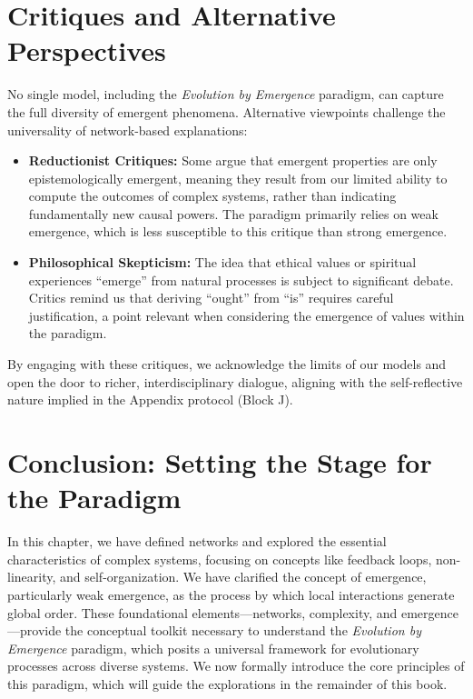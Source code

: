 \section*{Critiques and Alternative Perspectives}
No single model, including the \emph{Evolution by Emergence} paradigm, can capture the full diversity of emergent phenomena. Alternative viewpoints challenge the universality of network-based explanations:
\begin{itemize}
    \item \textbf{Reductionist Critiques:} Some argue that emergent properties are only epistemologically emergent, meaning they result from our limited ability to compute the outcomes of complex systems, rather than indicating fundamentally new causal powers. The paradigm primarily relies on weak emergence, which is less susceptible to this critique than strong emergence.
    \item \textbf{Philosophical Skepticism:} The idea that ethical values or spiritual experiences ``emerge'' from natural processes is subject to significant debate. Critics remind us that deriving ``ought'' from ``is'' requires careful justification, a point relevant when considering the emergence of values within the paradigm.
\end{itemize}
By engaging with these critiques, we acknowledge the limits of our models and open the door to richer, interdisciplinary dialogue, aligning with the self-reflective nature implied in the Appendix protocol (Block J). %

\section*{Conclusion: Setting the Stage for the Paradigm} %
In this chapter, we have defined networks and explored the essential characteristics of complex systems, focusing on concepts like feedback loops, non-linearity, and self-organization. We have clarified the concept of emergence, particularly weak emergence, as the process by which local interactions generate global order. These foundational elements—networks, complexity, and emergence—provide the conceptual toolkit necessary to understand the \emph{Evolution by Emergence} paradigm, which posits a universal framework for evolutionary processes across diverse systems. We now formally introduce the core principles of this paradigm, which will guide the explorations in the remainder of this book. %

